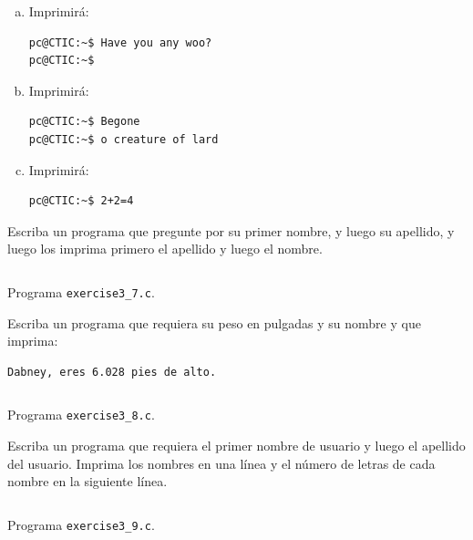 \documentclass[spanish,addpoints,answers,a4paper]{exam}
\begin{document}
\begin{questions}
\begin{solution}
\begin{multicols}{2}
\begin{enumerate}[(a)]
\item Imprimirá:

\begin{verbatim}
pc@CTIC:~$ Have you any woo?
pc@CTIC:~$ 
\end{verbatim}

\item Imprimirá:

\begin{verbatim}
pc@CTIC:~$ Begone
pc@CTIC:~$ o creature of lard
\end{verbatim}

\item Imprimirá:

\begin{verbatim}
pc@CTIC:~$ 2+2=4
\end{verbatim}

\end{enumerate}
\end{multicols}
\end{solution}

\question Escriba un programa que pregunte por su primer nombre, y luego su apellido, y luego los imprima primero el apellido y luego el nombre.

\begin{solution}
\begin{listing}[H]
	\footnotesize
	\inputminted{c}{exercise3_7.c}
	\caption{Programa \texttt{exercise3\_7.c}.}
	\label{lst:3.7}
\end{listing}
\end{solution}

\question Escriba un programa que requiera su peso en pulgadas y su nombre y que imprima:

\begin{verbatim}
Dabney, eres 6.028 pies de alto.
\end{verbatim}

\begin{solution}
\begin{listing}[H]
	\footnotesize
	\inputminted{c}{exercise3_8.c}
	\caption{Programa \texttt{exercise3\_8.c}.}
	\label{lst:3.8}
\end{listing}
\end{solution}

\question Escriba un programa que requiera el primer nombre de usuario y luego el apellido del usuario. Imprima los nombres en una línea y el número de letras de cada nombre en la siguiente línea.

\begin{solution}
\begin{listing}[H]
	\footnotesize
	\inputminted{c}{exercise3_9.c}
	\caption{Programa \texttt{exercise3\_9.c}.}
	\label{lst:3.9}
\end{listing}
\end{solution}


\end{questions}
\end{document}
